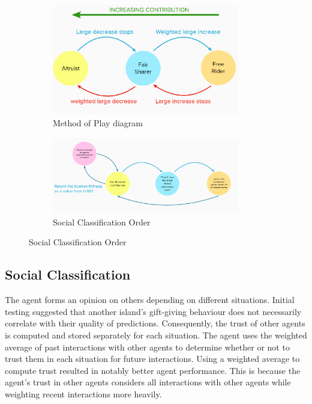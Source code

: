 \begin{figure}
\centering
\begin{subfigure}{.49\textwidth}
    \centering
    \includegraphics[width=0.9\textwidth]{images/MethodofPlay.png}
    \caption{Method of Play diagram}
    \label{fig:methods-of-play}
\end{subfigure}
\begin{subfigure}{.49\textwidth}
    \centering
    \includegraphics[width=0.9\textwidth]{images/Social.png}
    \caption{Social Classification Order}
    \label{fig:social-order}
\end{subfigure}
\end{figure}

\subsection{Social Classification}
The agent forms an opinion on others depending on different situations. Initial testing suggested that another island's gift-giving behaviour does not necessarily correlate with their quality of predictions. Consequently, the trust of other agents is computed and stored separately for each situation. The agent uses the weighted average of past interactions with other agents to determine whether or not to trust them in each situation for future interactions. Using a weighted average to compute trust resulted in notably better agent performance. This is because the agent's trust in other agents considers all interactions with other agents while weighting recent interactions more heavily.

